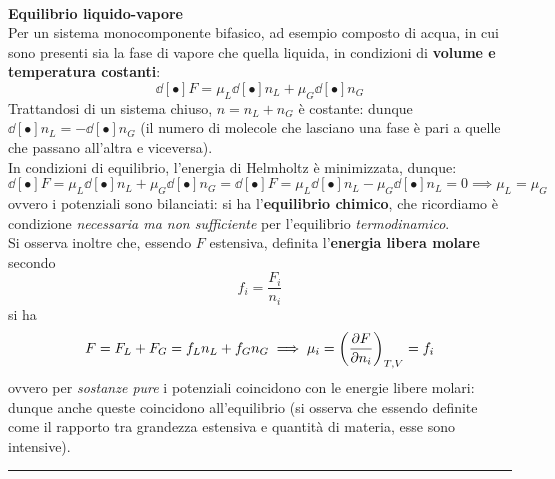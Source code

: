 \documentclass[10pt, oneside]{book}
\newcommand{\infobox}[2]{\vspace{0.5cm}~\\ \textbf{#1} \hrulefill \vspace{0.2cm}\\#2 {}\,\\\hrule \vspace{0.5cm}}
\newcommand{\ds}{\displaystyle}
\begin{document}
\infobox{Equilibrio liquido-vapore}{Per un sistema monocomponente bifasico, ad esempio composto di acqua, in cui sono presenti sia la fase di vapore che quella liquida, in condizioni di \textbf{volume e temperatura costanti}:
\[\dd[•]{F} = \mu_L \dd[•]{n_L} + \mu_G \dd[•]{n_G}\]
Trattandosi di un sistema chiuso, $n = n_L + n_G$ è costante: dunque $\ds \dd[•]{n_L} = - \dd[•]{n_G}$ (il numero di molecole che lasciano una fase è pari a quelle che passano all'altra e viceversa).\\
In condizioni di equilibrio, l'energia di Helmholtz è minimizzata, dunque:
\[\dd[•]{F} = \mu_L \dd[•]{n_L} + \mu_G \dd[•]{n_G} = \dd[•]{F} = \mu_L \dd[•]{n_L} - \mu_G \dd[•]{n_L} = 0 \implies \mu_L = \mu_G\]
ovvero i potenziali sono bilanciati: si ha l'\textbf{equilibrio chimico}, che ricordiamo è condizione \textit{necessaria ma non sufficiente} per l'equilibrio \textit{termodinamico}.\\
Si osserva inoltre che, essendo $F$ estensiva, definita l'\textbf{energia libera molare} secondo
\[f_i = \frac{F_i}{n_i}\]
si ha
\[F = F_L + F_G = f_L n_L + f_G n_G  \implies \mu_i = \bigg(\pdv{F}{n_i}\bigg)_{T,V} = f_i\]
ovvero per \textit{sostanze pure} i potenziali coincidono con le energie libere molari: dunque anche queste coincidono all'equilibrio (si osserva che essendo definite come il rapporto tra grandezza estensiva e quantità di materia, esse sono intensive).
}
\end{document}

